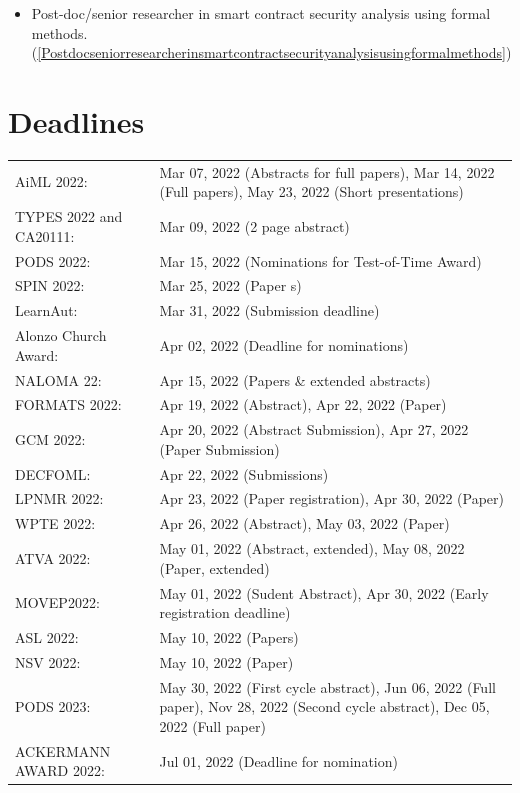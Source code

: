 \documentclass[prodmode,acmtecs]{acmsmall} %
\begin{document}
\begin{itemize}
\begin{itemize}\item Post-doc/senior researcher in smart contract security analysis using formal methods. (\cref{Postdocseniorresearcherinsmartcontractsecurityanalysisusingformalmethods})
\end{itemize} 
\end{itemize}\section{Deadlines}\label{deadlines}\begin{tabulary}{\linewidth}{LL}AiML 2022:  & Mar 07, 2022 (Abstracts for full papers), Mar 14, 2022 (Full papers), May 23, 2022 (Short presentations) \\
TYPES 2022 and CA20111:  & Mar 09, 2022 (2 page abstract) \\
PODS 2022:  & Mar 15, 2022 (Nominations for Test-of-Time Award) \\
SPIN 2022:  & Mar 25, 2022 (Paper s) \\
LearnAut:  & Mar 31, 2022 (Submission deadline) \\
Alonzo Church Award:  & Apr 02, 2022 (Deadline for nominations) \\
NALOMA 22:  & Apr 15, 2022 (Papers \& extended abstracts) \\
FORMATS 2022:  & Apr 19, 2022 (Abstract), Apr 22, 2022 (Paper) \\
GCM 2022:  & Apr 20, 2022 (Abstract Submission), Apr 27, 2022 (Paper Submission) \\
DECFOML:  & Apr 22, 2022 (Submissions) \\
LPNMR 2022:  & Apr 23, 2022 (Paper registration), Apr 30, 2022 (Paper) \\
WPTE 2022:  & Apr 26, 2022 (Abstract), May 03, 2022 (Paper) \\
ATVA 2022:  & May 01, 2022 (Abstract, extended), May 08, 2022 (Paper, extended) \\
MOVEP2022:  & May 01, 2022 (Sudent Abstract), Apr 30, 2022 (Early registration deadline) \\
ASL 2022:  & May 10, 2022 (Papers) \\
NSV 2022:  & May 10, 2022 (Paper) \\
PODS 2023:  & May 30, 2022 (First cycle abstract), Jun 06, 2022 (Full paper), Nov 28, 2022 (Second cycle abstract), Dec 05, 2022 (Full paper) \\
ACKERMANN AWARD 2022:  & Jul 01, 2022 (Deadline for nomination) \\
\end{tabulary}
\end{document}
